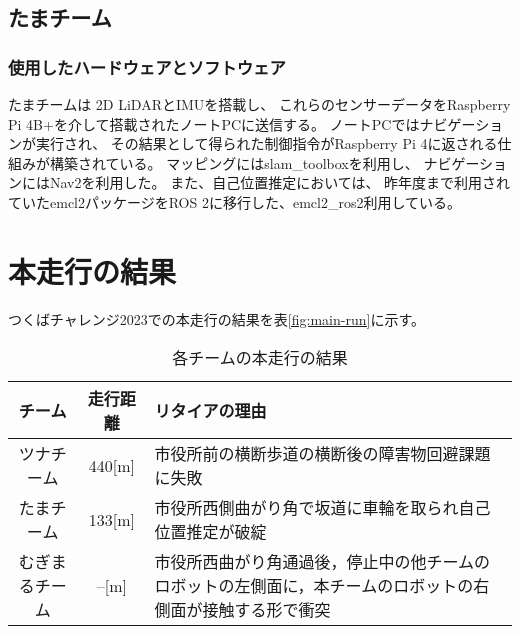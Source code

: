 \documentclass[twocolumn,9pt]{jsproceedings}
\begin{document}

\subsection{たまチーム}\label{sub:localization}

\subsubsection{使用したハードウェアとソフトウェア}

たまチームは 2D LiDARとIMUを搭載し、
これらのセンサーデータをRaspberry Pi 4B+を介して搭載されたノートPCに送信する。
ノートPCではナビゲーションが実行され、
その結果として得られた制御指令がRaspberry Pi 4に返される仕組みが構築されている。
マッピングにはslam\_toolboxを利用し、
ナビゲーションにはNav2を利用した。
また、自己位置推定においては、
昨年度まで利用されていたemcl2パッケージをROS 2に移行した、emcl2\_ros2利用している。

\section{本走行の結果}

つくばチャレンジ2023での本走行の結果を表\ref{fig:main-run}に示す。

\begin{table}[h]
  \caption{各チームの本走行の結果}
  \label{MainRun}
  \begin{tabular}{|c|c|p{4.0cm}|}
    \hline
    チーム         & 走行距離 & リタイアの理由                                                                                             \\
    \hline
    ツナチーム     & 440[m]   & 市役所前の横断歩道の横断後の障害物回避課題に失敗                                                           \\
    \hline
    たまチーム     & 133[m]   & 市役所西側曲がり角で坂道に車輪を取られ自己位置推定が破綻                                                   \\
    \hline
    むぎまるチーム & --[m]    & 市役所西曲がり角通過後，停止中の他チームのロボットの左側面に，本チームのロボットの右側面が接触する形で衝突 \\
    \hline
  \end{tabular}
\end{table}
\end{document}
